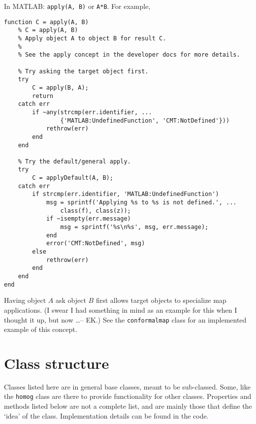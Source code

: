 \documentclass[12pt]{article}
\begin{document}
\noindent In MATLAB: \verb+apply(A, B)+ or \verb+A*B+. For example,
\begin{lstlisting}[frame=single]
function C = apply(A, B)
    % C = apply(A, B)
    % Apply object A to object B for result C.
    %
    % See the apply concept in the developer docs for more details.
    
    % Try asking the target object first.
    try
        C = apply(B, A);
        return
    catch err
        if ~any(strcmp(err.identifier, ...
                {'MATLAB:UndefinedFunction', 'CMT:NotDefined'}))
            rethrow(err)
        end
    end
    
    % Try the default/general apply.
    try
        C = applyDefault(A, B);
    catch err
        if strcmp(err.identifier, 'MATLAB:UndefinedFunction')
            msg = sprintf('Applying %s to %s is not defined.', ...
                class(f), class(z));
            if ~isempty(err.message)
                msg = sprintf('%s\n%s', msg, err.message);
            end
            error('CMT:NotDefined', msg)
        else
            rethrow(err)
        end
    end
end
\end{lstlisting}

Having object $A$ ask object $B$ first allows target objects to specialize map applications. (I swear I had something in mind as an example for this when I thought it up, but now \ldots -- EK.) See the \verb+conformalmap+ class for an implemented example of this concept.


\section{Class structure}
Classes listed here are in general base classes, meant to be sub-classed. Some, like the \verb+homog+ class are there to provide functionality for other classes. Properties and methods listed below are not a complete list, and are mainly those that define the `idea' of the class. Implementation details can be found in the code.
\end{document}
